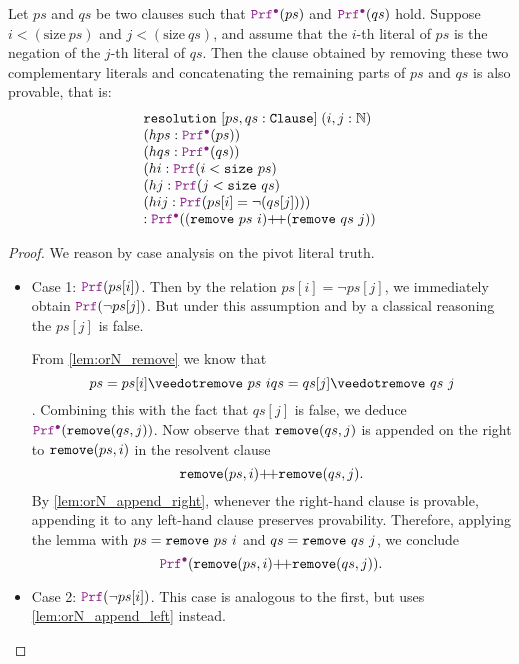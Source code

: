 \begin{theorem}[Resolution]\label{th:resolution}
Let $ps$ and $qs$ be two clauses such that $\prfcl(ps)$ and $\prfcl(qs)$ hold.
Suppose $i < (\mathrm{size}~ps)$ and $j < (\mathrm{size}~qs)$, and assume that the $i$-th literal of $ps$ is the negation of the $j$-th literal of $qs$.
Then the clause obtained by removing these two complementary literals and  concatenating the remaining parts of $ps$ and $qs$ is also provable, that is:
\[
\begin{array}{l}
  \tt{resolution}~[ps, qs : \tt{Clause}]\; (i, j : \mathbb{N}) \\
  (hps : \prfcl(ps)) \\
  (hqs : \prfcl(qs)) \\
  (hi  : \prf(i < \tt{size}~ps) \\
  (hj  : \prf(j < \tt{size}~qs) \\
  (hij : \prf(ps[i] = \lnot(qs[j]))) \\
  : \prfcl((\tt{remove}~ps~i) \pp (\tt{remove}~qs~j))
\end{array}
\]
\begin{proof}
We reason by case analysis on the pivot literal truth.

\begin{itemize}
\item[] Case 1: \(\prf(ps[i])\).
  Then by the relation $ps[i] = \lnot ps[j]$, we immediately obtain $\prf(\lnot ps[j])$.
  But under this assumption and by a classical reasoning the $ps[j]$ is false.

  From \cref{lem:orN_remove} we know that
  \[
      ps = ps[i] \veedot \kw{remove}~ps~i\\
      qs = qs[j] \veedot \kw{remove}~qs~j
  \].
  Combining this with the fact that $qs[j]$ is false, we deduce $\prfcl(\kw{remove}(qs,j))$.
  Now observe that $\texttt{\upshape{remove}}(qs,j)$ is appended on the right to $\texttt{\upshape{remove}}(ps,i)$
  in the resolvent clause
  \[
    \texttt{\upshape{remove}}(ps,i)  {+}\!{+}  \texttt{\upshape{remove}}(qs,j).
  \]
  By \cref{lem:orN_append_right}, whenever the right-hand clause is provable,
  appending it to any left-hand clause preserves provability.
  Therefore, applying the lemma with $ps =\texttt{\upshape{remove}}~ps~i$ and $qs =\texttt{\upshape{remove}}~qs~j$,
  we conclude
  \[
    \prfcl(\kw{remove}(ps,i) \pp \kw{remove}(qs,j)).
  \]
\item[] Case 2: \(\prf(\lnot ps[i])\). This case is analogous to the first, but uses \cref{lem:orN_append_left} instead.
\end{itemize}
\end{proof}
\end{theorem}


